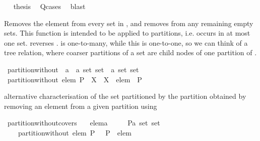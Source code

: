 \begin{isabellebody}
\ \isamarkupfalse%
\ {\isacharquery}thesis\ \isamarkupfalse%
\ Q{\isacharunderscore}cases\ \isamarkupfalse%
\ blast\isanewline
{}\isamarkupfalse%
%
\endisatagproof
{\isafoldproof}%
%
\isadelimproof
%
\endisadelimproof
%
\begin{isamarkuptext}%
Removes the element  from every set in , and removes from  any
  remaining empty sets.  This function is intended to be applied to partitions, i.e. 
  occurs in at most one set.   reverses .
 is one-to-many, while this is one-to-one, so we can think of a tree relation,
where coarser partitions of a set  are child nodes of one partition of .%
\end{isamarkuptext}%
\isamarkuptrue%
\isamarkupfalse%
\ partition{\isacharunderscore}without\ {\isacharcolon}{\isacharcolon}\ {\isachardoublequoteopen}{\isacharprime}a\ {\isasymRightarrow}\ {\isacharprime}a\ set\ set\ {\isasymRightarrow}\ {\isacharprime}a\ set\ set{\isachardoublequoteclose}\isanewline
{}\ {\isachardoublequoteopen}partition{\isacharunderscore}without\ elem\ P\ {\isacharequal}\ {\isacharparenleft}{\isasymlambda}X\ {\isachardot}\ X\ {\isacharminus}\ {\isacharbraceleft}elem{\isacharbraceright}{\isacharparenright}\ {\isacharbackquote}\ P\ {\isacharminus}\ {\isacharbraceleft}{\isacharbraceleft}{\isacharbraceright}{\isacharbraceright}{\isachardoublequoteclose}%
\begin{isamarkuptext}%
alternative characterisation of the set partitioned by the partition obtained 
  by removing an element from a given partition using %
\end{isamarkuptext}%
\isamarkuptrue%
\isamarkupfalse%
\ partition{\isacharunderscore}without{\isacharunderscore}covers{\isacharcolon}\isanewline
\ \ \ elem{\isacharcolon}{\isacharcolon}{\isacharprime}a\isanewline
\ \ \ \ \ P{\isacharcolon}{\isacharcolon}{\isachardoublequoteopen}{\isacharprime}a\ set\ set{\isachardoublequoteclose}\isanewline
\ \ \ {\isachardoublequoteopen}{\isasymUnion}\ partition{\isacharunderscore}without\ elem\ P\ {\isacharequal}\ {\isasymUnion}\ P\ {\isacharminus}\ {\isacharbraceleft}elem{\isacharbraceright}{\isachardoublequoteclose}\isanewline

\end{isabellebody}

